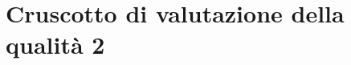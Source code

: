 


\section{Cruscotto di valutazione della qualità 2}
\label{sec:Cruscotto di valutazione della qualità 2}